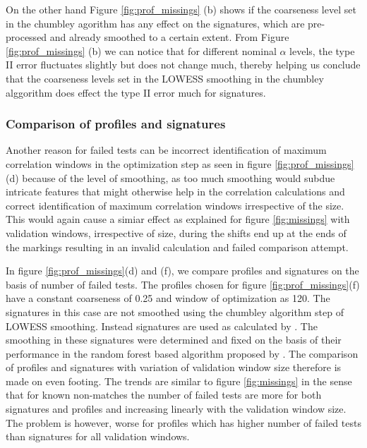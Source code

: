 \documentclass[12pt]{article}
\begin{document}
On the other hand Figure \ref{fig:prof_missings} (b) shows if the
coarseness level set in the chumbley agorithm has any effect on the
signatures, which are pre-processed and already smoothed to a certain
extent. From Figure \ref{fig:prof_missings} (b) we can notice that for
different nominal \(\alpha\) levels, the type II error fluctuates
slightly but does not change much, thereby helping us conclude that the
coarseness levels set in the LOWESS smoothing in the chumbley alggorithm
does effect the type II error much for signatures.

\subsubsection{Comparison of profiles and
signatures}\label{comparison-of-profiles-and-signatures}

Another reason for failed tests can be incorrect identification of
maximum correlation windows in the optimization step as seen in figure
\ref{fig:prof_missings}(d) because of the level of smoothing, as too
much smoothing would subdue intricate features that might otherwise help
in the correlation calculations and correct identification of maximum
correlation windows irrespective of the size. This would again cause a
simiar effect as explained for figure \ref{fig:missings} with validation
windows, irrespective of size, during the shifts end up at the ends of
the markings resulting in an invalid calculation and failed comparison
attempt.

In figure \ref{fig:prof_missings}(d) and (f), we compare profiles and
signatures on the basis of number of failed tests. The profiles chosen
for figure \ref{fig:prof_missings}(f) have a constant coarseness of 0.25
and window of optimization as 120. The signatures in this case are not
smoothed using the chumbley algorithm step of LOWESS smoothing. Instead
signatures are used as calculated by \citet{aoas}. The smoothing in
these signatures were determined and fixed on the basis of their
performance in the random forest based algorithm proposed by
\citet{aoas}. The comparison of profiles and signatures with variation
of validation window size therefore is made on even footing. The trends
are similar to figure \ref{fig:missings} in the sense that for known
non-matches the number of failed tests are more for both signatures and
profiles and increasing linearly with the validation window size. The
problem is however, worse for profiles which has higher number of failed
tests than signatures for all validation windows.
\end{document}
